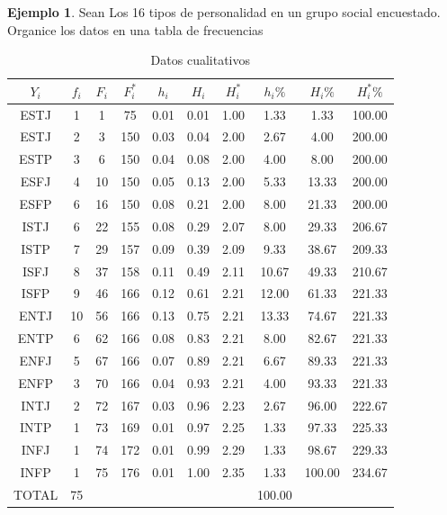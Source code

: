 \documentclass[
  11pt,
]{krantz}
\theoremstyle{definition}
\theoremstyle{definition}
\newtheorem{example}{Ejemplo}[chapter]
\theoremstyle{definition}
\theoremstyle{definition}
\theoremstyle{remark}
\begin{document}
\begin{example}

Sean Los 16 tipos de personalidad en un grupo social encuestado. Organice los datos en una tabla de frecuencias

\begin{longtable}[t]{cccccccccc}
\caption{\label{tab:cualitativa}Datos cualitativos}\\
\toprule
$Y_i$ & $f_i$ & $F_i$ & $F_i^*$ & $h_i$ & $H_i$ & $H_i^*$ & $h_i\%$ & $H_i\%$ & $H_i^*\%$\\
\midrule
ESTJ & 1 & 1 & 75 & 0.01 & 0.01 & 1.00 & 1.33 & 1.33 & 100.00\\
ESTJ & 2 & 3 & 150 & 0.03 & 0.04 & 2.00 & 2.67 & 4.00 & 200.00\\
ESTP & 3 & 6 & 150 & 0.04 & 0.08 & 2.00 & 4.00 & 8.00 & 200.00\\
ESFJ & 4 & 10 & 150 & 0.05 & 0.13 & 2.00 & 5.33 & 13.33 & 200.00\\
ESFP & 6 & 16 & 150 & 0.08 & 0.21 & 2.00 & 8.00 & 21.33 & 200.00\\
ISTJ & 6 & 22 & 155 & 0.08 & 0.29 & 2.07 & 8.00 & 29.33 & 206.67\\
ISTP & 7 & 29 & 157 & 0.09 & 0.39 & 2.09 & 9.33 & 38.67 & 209.33\\
ISFJ & 8 & 37 & 158 & 0.11 & 0.49 & 2.11 & 10.67 & 49.33 & 210.67\\
ISFP & 9 & 46 & 166 & 0.12 & 0.61 & 2.21 & 12.00 & 61.33 & 221.33\\
ENTJ & 10 & 56 & 166 & 0.13 & 0.75 & 2.21 & 13.33 & 74.67 & 221.33\\
ENTP & 6 & 62 & 166 & 0.08 & 0.83 & 2.21 & 8.00 & 82.67 & 221.33\\
ENFJ & 5 & 67 & 166 & 0.07 & 0.89 & 2.21 & 6.67 & 89.33 & 221.33\\
ENFP & 3 & 70 & 166 & 0.04 & 0.93 & 2.21 & 4.00 & 93.33 & 221.33\\
INTJ & 2 & 72 & 167 & 0.03 & 0.96 & 2.23 & 2.67 & 96.00 & 222.67\\
INTP & 1 & 73 & 169 & 0.01 & 0.97 & 2.25 & 1.33 & 97.33 & 225.33\\
INFJ & 1 & 74 & 172 & 0.01 & 0.99 & 2.29 & 1.33 & 98.67 & 229.33\\
INFP & 1 & 75 & 176 & 0.01 & 1.00 & 2.35 & 1.33 & 100.00 & 234.67\\
TOTAL & 75 &  &  &  &  &  & 100.00 &  & \\
\bottomrule
\end{longtable}

\end{example}
\end{document}
